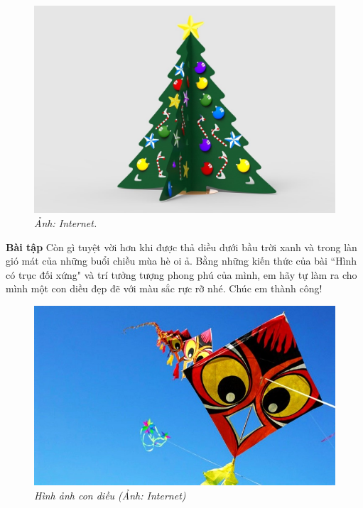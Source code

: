 \begin{multicols}{2}
\begin{figure}[H]
		\includegraphics[height= 0.31\linewidth]{9c}
		\caption{\small\textit{\color{toancuabi}Ảnh: Internet.}}
		\vspace*{-10pt}
	\end{figure}
	\textbf{\color{toancuabi}Bài tập}
	\vskip 0.1cm
	Còn gì tuyệt vời hơn khi được thả diều dưới bầu trời xanh và trong làn gió mát của những buổi chiều mùa hè oi ả. Bằng những kiến thức của bài ``Hình có trục đối xứng" và trí tưởng tượng phong phú của mình, em hãy tự làm ra cho mình một con diều đẹp đẽ với màu sắc rực rỡ nhé. Chúc em thành công!
	\begin{figure}[H]
		\vspace*{-5pt}
		\centering
		\captionsetup{labelformat= empty, justification=centering}
		\includegraphics[width= 1\linewidth]{10}
		\caption{\small\textit{\color{toancuabi}Hình ảnh con diều (Ảnh: Internet)}}
		\vspace*{-10pt}
	\end{figure}
\end{multicols}

